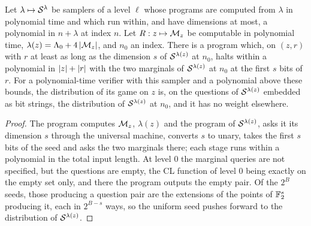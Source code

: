 \begin{lemma}
\label{lem:class-sampler}
\leanok
Let $\lambda \mapsto \mathcal{S}^\lambda$ be samplers of a level $\ell$ whose programs are computed
from $\lambda$ in polynomial time and which run within, and have dimensions at most, a polynomial
in $n + \lambda$ at index $n$. Let $R : z \mapsto \mathcal{M}_z$ be computable in polynomial
time, $\lambda(z) = \Lambda_0 + 4\left\vert {\mathcal{M}_z} \right\vert$, and $n_0$ an index. There is a program
which, on $(z, r)$ with $r$ at least as long as the dimension $s$ of $\mathcal{S}^{\lambda(z)}$ at
$n_0$, halts within a polynomial in $\left\vert {z} \right\vert + \left\vert {r} \right\vert$ with the two marginals of
$\mathcal{S}^{\lambda(z)}$ at $n_0$ at the first $s$ bits of $r$. For a polynomial-time verifier
with this sampler and a polynomial above these bounds, the distribution of its game on $z$ is,
on the questions of $\mathcal{S}^{\lambda(z)}$ embedded as bit strings, the distribution of
$\mathcal{S}^{\lambda(z)}$ at $n_0$, and it has no weight elsewhere.
\end{lemma}

\begin{proof}
\leanok
The program computes $\mathcal{M}_z$, $\lambda(z)$ and the program of $\mathcal{S}^{\lambda(z)}$, asks
it its dimension $s$ through the universal machine, converts $s$ to unary, takes the first $s$
bits of the seed and asks the two marginals there; each stage runs within a polynomial in the
total input length. At level $0$ the marginal queries are not specified, but the questions are
empty, the CL function of level $0$ being exactly on the empty set only, and there the program
outputs the empty pair. Of the $2^B$ seeds, those producing a question pair are the extensions of
the points of $\mathbb{F}_2^s$ producing it, each in $2^{B - s}$ ways, so the uniform seed pushes forward
to the distribution of $\mathcal{S}^{\lambda(z)}$.
\end{proof}

\effortHard

